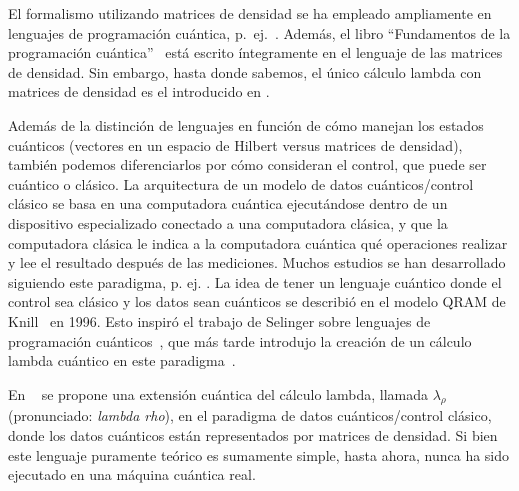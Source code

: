 El formalismo utilizando matrices de densidad se ha empleado ampliamente en lenguajes de programación cuántica, p.\ ej.\ \cite{SelingerMSCS04, hondt_panangaden_2006, bisimulation, invariants_quantum, quantum_markov, invariants_quantum}. Además, el libro ``Fundamentos de la programación cuántica''~\cite{Ying2016} está escrito íntegramente en el lenguaje de las matrices de densidad. Sin embargo, hasta donde sabemos, el único cálculo lambda con matrices de densidad es el introducido en \cite{lamrho}.

Además de la distinción de lenguajes en función de cómo manejan los estados cuánticos (vectores en un espacio de Hilbert versus matrices de densidad), también podemos diferenciarlos por cómo consideran el control, que puede ser cuántico o clásico. La arquitectura de un modelo de datos cuánticos/control clásico se basa en una computadora cuántica ejecutándose dentro de un dispositivo especializado conectado a una computadora clásica, y que la computadora clásica le indica a la computadora cuántica qué operaciones realizar y lee el resultado después de las mediciones. Muchos estudios se han desarrollado siguiendo este paradigma, p. ej. \cite{Altenkirch, Selinger_2005, Green_2013, high_order_quantum, zorzi_2016}. La idea de tener un lenguaje cuántico donde el control sea clásico y los datos sean cuánticos se describió en el modelo QRAM de Knill~\cite{Knill1996} en 1996. Esto inspiró el trabajo de Selinger sobre lenguajes de programación cuánticos~\cite{SelingerMSCS04}, que más tarde introdujo la creación de un cálculo lambda cuántico en este paradigma~\cite{Selinger_2005}.


En ~\cite{lamrho} se propone una extensión cuántica del cálculo lambda, llamada $\lambda_\rho$ (pronunciado: \textit{lambda rho}), en el paradigma de datos cuánticos/control clásico, donde los datos cuánticos están representados por matrices de densidad. Si bien este lenguaje puramente teórico es sumamente simple, hasta ahora, nunca ha sido ejecutado en una máquina cuántica real.

